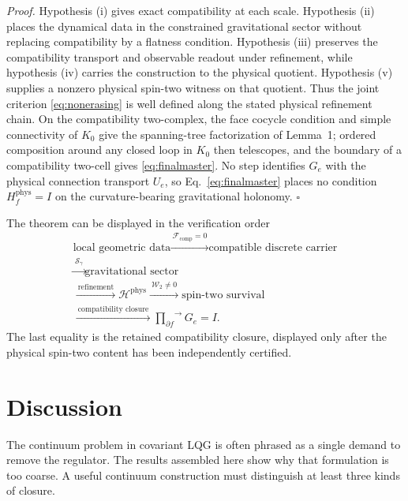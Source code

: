 \documentclass[aps,prd,reprint,nofootinbib,superscriptaddress]{revtex4-2}
\newcommand{\phys}{\mathrm{phys}}
\begin{document}
\emph{Proof.}
Hypothesis (i) gives exact compatibility at each scale. Hypothesis (ii) places the dynamical data in the constrained gravitational sector without replacing compatibility by a flatness condition. Hypothesis (iii) preserves the compatibility transport and observable readout under refinement, while hypothesis (iv) carries the construction to the physical quotient. Hypothesis (v) supplies a nonzero physical spin-two witness on that quotient. Thus the joint criterion \eqref{eq:nonerasing} is well defined along the stated physical refinement chain. On the compatibility two-complex, the face cocycle condition and simple connectivity of $K_0$ give the spanning-tree factorization of Lemma~1; ordered composition around any closed loop in $K_0$ then telescopes, and the boundary of a compatibility two-cell gives \eqref{eq:finalmaster}. No step identifies $G_e$ with the physical connection transport $U_e$, so Eq.~\eqref{eq:finalmaster} places no condition $H_f^{\phys}=I$ on the curvature-bearing gravitational holonomy. \hfill$\square$

The theorem can be displayed in the verification order
\begin{equation}
\boxed{
\begin{gathered}
\text{local geometric data}
\xrightarrow{\ \mathcal F_{\mathrm{comp}}=0\ }
\text{compatible discrete carrier}\\[-0.5mm]
\xrightarrow{\ \mathcal S_\gamma\ }
\text{gravitational sector}\\[-0.5mm]
\xrightarrow{\ \text{refinement}\ }
\mathcal H^{\phys}
\xrightarrow{\ \mathcal W_2\neq0\ }
\text{spin-two survival}\\[-0.5mm]
\xrightarrow{\ \text{compatibility closure}\ }
\overrightarrow{\prod_{\partial f}}G_e=I.
\end{gathered}}
\label{eq:wholechain}
\end{equation}
The last equality is the retained compatibility closure, displayed only after the physical spin-two content has been independently certified.

\section{Discussion}

The continuum problem in covariant LQG is often phrased as a single demand to remove the regulator. The results assembled here show why that formulation is too coarse. A useful continuum construction must distinguish at least three kinds of closure.
\end{document}
